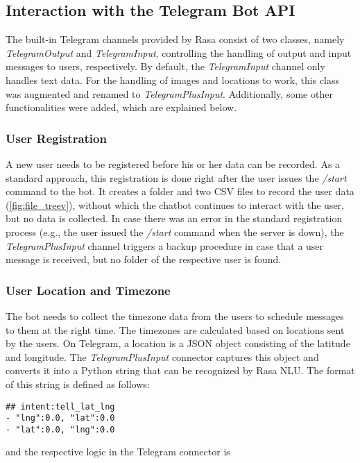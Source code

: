 \subsection{Interaction with the Telegram Bot API}
The built-in Telegram channels provided by Rasa consist of two classes, namely \emph{TelegramOutput} and \emph{TelegramInput}, controlling the handling of output and input messages to users, respectively. By default, the \emph{TelegramInput} channel only handles text data. For the handling of images and locations to work, this class was augmented and renamed to \emph{TelegramPlusInput}. Additionally, some other functionalities were added, which are explained below.

\subsubsection{User Registration}
A new user needs to be registered before his or her data can be recorded. As a standard approach, this registration is done right after the user issues the \emph{/start} command to the bot. It creates a folder and two CSV files to record the user data (\autoref{fig:file_treev}), without which the chatbot continues to interact with the user, but no data is collected. In case there was an error in the standard registration process (e.g., the user issued the \emph{/start} command when the server is down), the \emph{TelegramPlusInput} channel triggers a backup procedure in case that a user message is received, but no folder of the respective user is found.

\subsubsection{User Location and Timezone}
The bot needs to collect the timezone data from the users to schedule messages to them at the right time. The timezones are calculated based on locations sent by the users. On Telegram, a location is a JSON object consisting of the latitude and longitude. The \emph{TelegramPlusInput} connector captures this object and converts it into a Python string that can be recognized by Rasa NLU. The format of this string is defined as follows:

\begin{lstlisting}
## intent:tell_lat_lng
- "lng":0.0, "lat":0.0
- "lat":0.0, "lng":0.0
\end{lstlisting}

\bigskip
and the respective logic in the Telegram connector is

